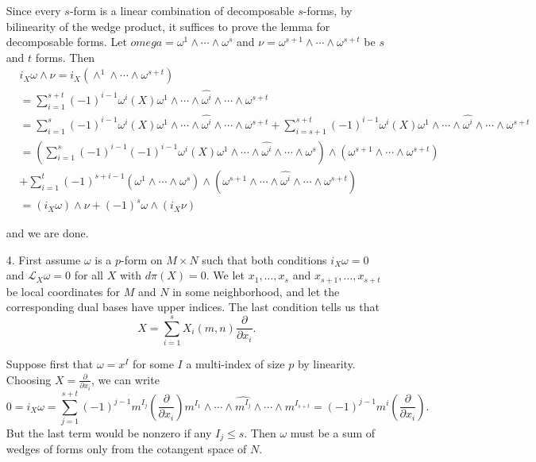 \documentclass[11pt, reqno]{article}
\theoremstyle{plain}
\theoremstyle{definition}
\theoremstyle{remark}
\begin{document}
\begin{enumerate}
    Since every $s$-form is a linear combination of decomposable $s$-forms, by bilinearity of the 
    wedge product, it suffices to prove the lemma for decomposable forms. Let $omega = \omega^1 \wedge \cdots \wedge \omega^s$
    and $\nu = \omega^{s+1}\wedge \cdots \wedge \omega^{s + t}$ be $s$ and $t$ forms. Then
    \begin{align*}
        &i_X{\omega \wedge \nu} = i_X(\wedge^1 \wedge \cdots \wedge \omega^{s + t})\\
        &= \sum_{i = 1}^{s+t}(-1)^{i-1}\omega^i(X)\omega^1 \wedge \cdots \wedge \hat{\omega^i}\wedge \cdots \wedge \omega^{s + t}\\
        &= \sum_{i = 1}^s (-1)^{i-1}\omega^i(X)\omega^1 \wedge \cdots \wedge \hat{\omega^i}\wedge \cdots \wedge \omega^{s + t}
        + \sum_{i = s+1}^{s + t} (-1)^{i-1}\omega^i(X)\omega^1 \wedge \cdots \wedge \hat{\omega^i}\wedge \cdots \wedge \omega^{s + t}\\
        &= \left(\sum_{i = 1}^s (-1)^{i-1}(-1)^{i-1}\omega^i(X)\omega^1 \wedge \cdots \wedge \hat{\omega^i}\wedge \cdots \wedge \omega^{s}\right)
        \wedge \left(\omega^{s+1}\wedge \cdots\wedge\omega^{s+t}\right)\\
        & + \sum_{i = 1}^{t}(-1)^{s+i-1}\left(\omega^1\wedge \cdots\wedge\omega^s\right)
        \wedge\left(\omega^{s+1}\wedge\cdots\wedge\hat{\omega^i}\wedge\cdots\wedge\omega^{s+t}\right)\\
        &= (i_X \omega)\wedge \nu + (-1)^s\omega\wedge(i_X\nu)
    \end{align*}

    and we are done. 

    \item[4.] First assume $\omega$ is a $p$-form on $M\times N$ such that both conditions 
    $i_X \omega = 0$ and $\mathcal{L}_X\omega = 0$ for all $X$ with $d\pi(X) = 0$. We let 
    $x_1,\dots, x_s$ and $x_{s+1},\dots, x_{s+t}$ be local coordinates for $M$ and $N$ in some neighborhood, and let the corresponding
    dual bases have upper indices. The last condition tells us that
    \[
        X = \sum_{i = 1}^s X_i(m,n)\frac{\partial}{\partial x_i}.
    \]

    Suppose first that $\omega = x^I$ for 
    some $I$ a multi-index of size $p$ by linearity. Choosing $X = \frac{\partial}{\partial x_i}$, we can write 
    \[
        0 = i_X\omega = \sum_{j = 1}^{s+t} (-1)^{j-1}m^{I_j}(\frac{\partial}{\partial x_i})m^{I_1}\wedge\cdots\wedge
        \hat{m^{I_j}}\wedge\cdots\wedge m^{I_{s+t}}
        = (-1)^{j-1}m^i(\frac{\partial}{\partial x_i}).
    \]
    But the last term would be nonzero if any $I_j \leq s$. Then $\omega$ must be a sum of 
    wedges of forms only from the cotangent space of $N$. 


\end{enumerate}
\end{document}
